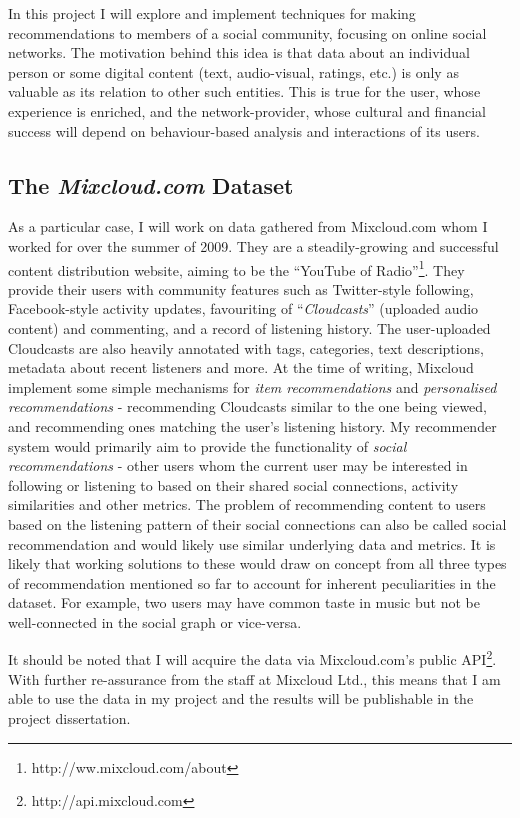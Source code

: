In this project I will explore and implement techniques for making recommendations to members of a social community, focusing on online social networks. The motivation behind this idea is that data about an individual person or some digital content (text, audio-visual, ratings, etc.) is only as valuable as its relation to other such entities. This is true for the user, whose experience is enriched, and the network-provider, whose cultural and financial success will depend on behaviour-based analysis and interactions of its users.

\subsection*{The \emph{Mixcloud.com} Dataset}
As a particular case, I will work on data gathered from Mixcloud.com whom I worked for over the summer of 2009. They are a steadily-growing and successful content distribution website, aiming to be the ``YouTube of Radio''\footnote{http://ww.mixcloud.com/about}. They provide their users with community features such as Twitter-style following, Facebook-style activity updates, favouriting of ``\emph{Cloudcasts}'' (uploaded audio content) and commenting, and a record of listening history. The user-uploaded Cloudcasts are also heavily annotated with tags, categories, text descriptions, metadata about recent listeners and more. At the time of writing, Mixcloud implement some simple mechanisms for \emph{item recommendations} and \emph{personalised recommendations} - recommending Cloudcasts similar to the one being viewed, and recommending ones matching the user's listening history. My recommender system would primarily aim to provide the functionality of \emph{social recommendations} - other users whom the current user may be interested in following or listening to based on their shared social connections, activity similarities and other metrics. The problem of recommending content to users based on the listening pattern of their social connections can also be called social recommendation and would likely use similar underlying data and metrics. It is likely that working solutions to these would draw on concept from all three types of recommendation mentioned so far to account for inherent peculiarities in the dataset. For example, two users may have common taste in music but not be well-connected in the social graph or vice-versa.

It should be noted that I will acquire the data via Mixcloud.com's public API\footnote{http://api.mixcloud.com}. With further re-assurance from the staff at Mixcloud Ltd., this means that I am able to use the data in my project and the results will be publishable in the project dissertation.

